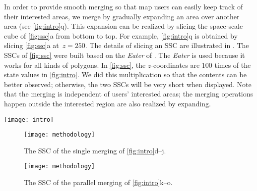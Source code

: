 \documentclass{ica}
\begin{document}
In order to provide smooth merging
so that map users can easily keep track of their interested areas,
we merge by gradually expanding an area over another area
(see \fig\ref{fig:intro}q).
This expansion can be realized 
by slicing the space-scale cube \citep[SSC,][]{vanOosterom2014Support} 
of \fig\ref{fig:ssc}a from bottom to top.
For example,  \fig\ref{fig:intro}q is obtained by slicing
\fig\ref{fig:ssc}a at~$z= 250$.
The details of slicing an SSC are illustrated in \citet{Meijers2020Web}.
The SSCs of \fig\ref{fig:ssc} were built 
based on the \emph{Eater} of \citet{Suba2014Merge}.
The \emph{Eater} is used because it works for all kinds of polygons.
In \fig\ref{fig:ssc}, the $z$-coordinates are $100$ times of
the state values in \fig\ref{fig:intro}.
We did this multiplication so that the contents can be better observed;
otherwise, the two SSCs will be very short when displayed.
Note that the merging is independent of users' interested areas;
the merging operations happen outside the interested region 
are also realized by expanding.





\begin{figure*}[tb]
\centering
\texttt{[image: intro]}
\caption{A comparison of different scale-transition strategies.
Each arrow inside the subfigures indicates a merging operation.
The arrow in the right-hand side indicates the states of zooming out.
%
(a--c): All changes are processed in one go.
(d--j): All changes are sequenced one by one rapidly.
(k--o): Changes are grouped, resulting in more animation duration for every change.
%
The numbers are the face IDs.
}
\label{fig:intro}
\end{figure*}



\begin{figure*}[htb]
\centering
\begin{subfigure}[t]{0.48\textwidth}
\centering
\texttt{[image: methodology]}
\caption{The SSC of the single merging of \figs\ref{fig:intro}d--j.}
\end{subfigure}
\hfill
\begin{subfigure}[t]{0.48\textwidth}
\centering
\texttt{[image: methodology]}
\caption{The SSC of the parallel merging of \figs\ref{fig:intro}k--o.}
\end{subfigure}
\caption{
In the left SSC, only one merging event is happening 
at a specific state ($z$-dimension), 
while in the right SSC multiple merging events may happen at the same state.
}
\label{fig:ssc}
\end{figure*}
\end{document}

